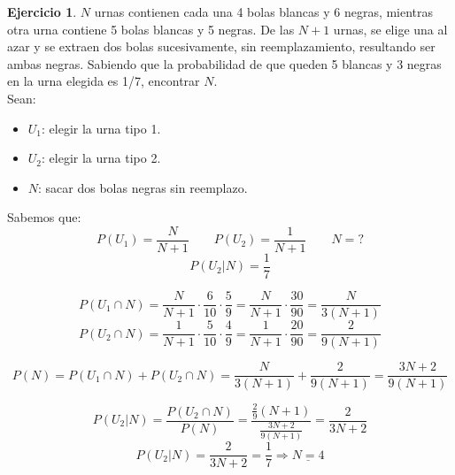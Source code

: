 \documentclass[a4paper, 12pt]{article}
\theoremstyle{definition}
\newtheorem{ej}{Ejercicio}
\begin{document}
\begin{ej}
\(N\) urnas contienen cada una 4 bolas blancas y 6 negras, mientras otra urna contiene 5 bolas blancas y 5 negras. De las \(N+1\) urnas, se elige una al azar y se extraen dos bolas sucesivamente, sin reemplazamiento, resultando ser ambas negras. Sabiendo que la probabilidad de que queden 5 blancas y 3 negras en la urna elegida es 1/7, encontrar \(N\). \\

Sean:
\begin{itemize}
	\item \(U_1\): elegir la urna tipo 1.
	\item \(U_2\): elegir la urna tipo 2.
	\item \(N\): sacar dos bolas negras sin reemplazo. 
\end{itemize}

Sabemos que:
\[
	P(U_1)= \frac{N}{N + 1} \qquad P(U_2) = \frac{1}{N+1} \qquad N = ?
\]
\[
	P(U_2|N) = \frac{1}{7}
\]

\[
	P(U_1 \cap N) = \frac{N}{N + 1} \cdot \frac{6}{10} \cdot \frac{5}{9} = \frac{N}{N + 1} \cdot \frac{30}{90} = \frac{N}{3(N+1)}
\]
\[
	P(U_2 \cap N) = \frac{1}{N + 1} \cdot \frac{5}{10} \cdot \frac{4}{9} = \frac{1}{N+1} \cdot \frac{20}{90} = \frac{2}{9(N+1)}
\]

\[
	P(N) = P(U_1 \cap N) + P(U_2 \cap N) = \frac{N}{3(N+1)} + \frac{2}{9(N+1)} = \frac{3N + 2}{9(N+1)}
\]

\[
	P(U_2|N) = \frac{P(U_2 \cap N)}{P(N)} = \frac{\frac{2}{9}(N+1)}{\frac{3N + 2}{9(N+1)}} = \frac{2}{3N + 2}
\]
\[
	P(U_2|N) = \frac{2}{3N+2} = \frac{1}{7} \Rightarrow \underline{N=4}
\]
\end{ej}
\end{document}
